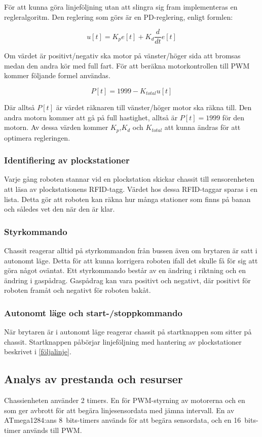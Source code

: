 För att kunna göra linjeföljning utan att slingra sig fram implementeras en regleralgoritm. Den reglering som görs är en PD-reglering, enligt formlen:

$$u[t] = K_{p}e[t] + K_{d}\frac{d}{dt}e[t]$$

Om värdet är positivt/negativ ska motor på vänster/höger sida att bromsas medan den andra kör med full fart. För att beräkna motorkontrollen till PWM kommer följande formel användas.

$$P[t] = 1999 - K_{total}u[t]$$

Där alltså $P[t]$ är värdet räknaren till vänster/höger motor ska räkna till. Den andra motorn kommer att gå på full hastighet, alltså är $P[t] = 1999$ för den motorn. Av dessa värden kommer $K_{p}$,$K_{d}$ och $K_{total}$ att kunna ändras för att optimera regleringen.


\subsubsection{Identifiering av plockstationer}

Varje gång roboten stannar vid en plockstation skickar chassit till sensorenheten att läsa av plockstationens RFID-tagg. Värdet hos dessa RFID-taggar sparas i en lista. Detta gör att roboten kan räkna hur många stationer som finns på banan och således vet den när den är klar.


\subsubsection{Styrkommando}

Chassit reagerar alltid på styrkommandon från bussen även om brytaren är satt i autonomt läge. Detta för att kunna korrigera roboten ifall det skulle få för sig att göra något oväntat. Ett styrkommando består av en ändring i riktning och en ändring i gaspådrag. Gaspådrag kan vara positivt och negativt, där positivt för roboten framåt och negativt för roboten bakåt. 


\subsubsection{Autonomt läge och start-/stoppkommando}

När brytaren är i autonomt läge reagerar chassit på startknappen som sitter på chassit. Startknappen påbörjar linjeföljning med hantering av plockstationer beskrivet i \ref{följalinje}.

\subsection{Analys av prestanda och resurser}

Chassienheten använder 2 timers. En för PWM-styrning av motorerna och en som ger avbrott för att begära linjesensordata med jämna intervall. En av ATmega1284:ans 8~bits-timers används för att begära sensordata, och en 16~bits-timer används till PWM.

